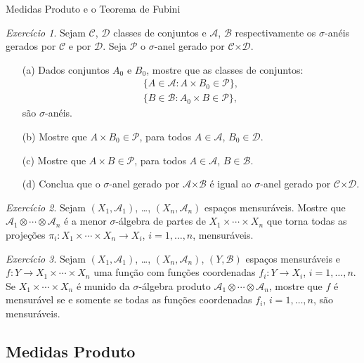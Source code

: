 \documentclass[oneside,final,11pt]{amsbook}
\newcommand{\Times}{\pmb{\times}}
\theoremstyle{remark}\newtheorem{exercise}{Exercício}[chapter]
\theoremstyle{remark}\newtheorem{*exercise}[exercise]{\hbox to 0pt{\hskip 0pt minus 1fil*}Exercício}
\theoremstyle{definition}\newtheorem{exdefin}{Definição}[chapter]
\theoremstyle{plain}\newtheorem{teo}{Teorema}[section]
\theoremstyle{plain}\newtheorem{lem}[teo]{Lema}
\theoremstyle{plain}\newtheorem{prop}[teo]{Proposição}
\theoremstyle{plain}\newtheorem{cor}[teo]{Corolário}
\theoremstyle{definition}\newtheorem{defin}[teo]{Definição}
\theoremstyle{remark}\newtheorem{rem}[teo]{Observação}
\theoremstyle{definition}\newtheorem{notation}[teo]{Notação}
\theoremstyle{definition}\newtheorem{convention}[teo]{Convenção}
\theoremstyle{definition}\newtheorem{example}[teo]{Exemplo}
\numberwithin{section}{chapter}
\numberwithin{equation}{section}
\begin{document}
\begin{chapter}{Medidas Produto e o Teorema de Fubini}
\begin{exercise}\label{exe:melhorprodgeradores}
Sejam $\mathcal C$, $\mathcal D$ classes de conjuntos e $\mathcal A$, $\mathcal B$
respectivamente os $\sigma$-anéis gerados por $\mathcal C$ e por $\mathcal D$.
Seja $\mathcal P$ o $\sigma$-anel gerado por $\mathcal C\Times\mathcal D$.
\begin{itemize}
\item[(a)] Dados conjuntos $A_0$ e $B_0$, mostre que as classes de conjuntos:
\begin{gather*}
\big\{A\in\mathcal A:A\times B_0\in\mathcal P\big\},\\
\big\{B\in\mathcal B:A_0\times B\in\mathcal P\big\},
\end{gather*}
são $\sigma$-anéis.
\item[(b)] Mostre que $A\times B_0\in\mathcal P$, para todos $A\in\mathcal A$, $B_0\in\mathcal D$.
\item[(c)] Mostre que $A\times B\in\mathcal P$, para todos $A\in\mathcal A$, $B\in\mathcal B$.
\item[(d)] Conclua que o $\sigma$-anel gerado por $\mathcal A\Times\mathcal B$ é igual
ao $\sigma$-anel gerado por $\mathcal C\Times\mathcal D$.
\end{itemize}
\end{exercise}

\begin{exercise}
Sejam $(X_1,\mathcal A_1)$, \dots, $(X_n,\mathcal A_n)$ espaços mensuráveis. Mostre que
$\mathcal A_1\otimes\cdots\otimes\mathcal A_n$ é a menor $\sigma$-álgebra de partes de $X_1\times\cdots\times X_n$
que torna todas as projeções $\pi_i:X_1\times\cdots\times X_n\to X_i$, $i=1,\ldots,n$, mensuráveis.
\end{exercise}

\begin{exercise}
Sejam $(X_1,\mathcal A_1)$, \dots, $(X_n,\mathcal A_n)$, $(Y,\mathcal B)$ espaços mensuráveis e
$f:Y\to X_1\times\cdots\times X_n$ uma função com funções coordenadas $f_i:Y\to X_i$, $i=1,\ldots,n$.
Se $X_1\times\cdots\times X_n$ é munido da $\sigma$-álgebra produto $\mathcal A_1\otimes\cdots\otimes\mathcal A_n$,
mostre que $f$ é mensurável se e somente se todas as funções coordenadas $f_i$, $i=1,\ldots,n$, são mensuráveis.
\end{exercise}

\subsection*{Medidas Produto}


\end{chapter}
\end{document}
